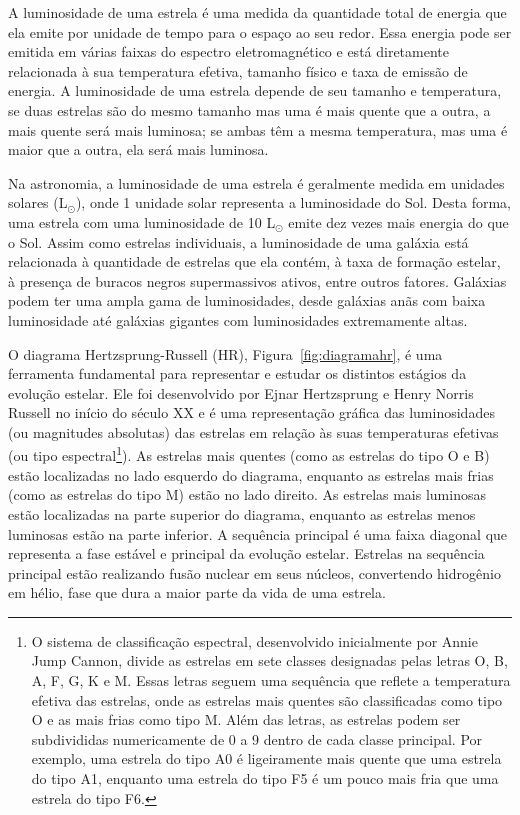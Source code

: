 A luminosidade de uma estrela é uma medida da quantidade total de energia que ela emite por unidade de tempo para o espaço ao seu redor. Essa energia pode ser emitida em várias faixas do espectro eletromagnético e está diretamente relacionada à sua temperatura efetiva, tamanho físico e taxa de emissão de energia. A luminosidade de uma estrela depende de seu tamanho e temperatura, se duas estrelas são do mesmo tamanho mas uma é mais quente que a outra, a mais quente será mais luminosa; se ambas têm a mesma temperatura, mas uma é maior que a outra, ela será mais luminosa.

Na astronomia, a luminosidade de uma estrela é geralmente medida em unidades solares (L\(_\odot\)), onde 1 unidade solar representa a luminosidade do Sol. Desta forma, uma estrela com uma luminosidade de 10 L\(_\odot\) emite dez vezes mais energia do que o Sol. Assim como estrelas individuais, a luminosidade de uma galáxia está relacionada à quantidade de estrelas que ela contém, à taxa de formação estelar, à presença de buracos negros supermassivos ativos, entre outros fatores. Galáxias podem ter uma ampla gama de luminosidades, desde galáxias anãs com baixa luminosidade até galáxias gigantes com luminosidades extremamente altas.

O diagrama Hertzsprung-Russell (HR), Figura~\ref{fig:diagramahr}, é uma ferramenta fundamental para representar e estudar os distintos estágios da evolução estelar. Ele foi desenvolvido por Ejnar Hertzsprung e Henry Norris Russell no início do século XX e é uma representação gráfica das luminosidades (ou magnitudes absolutas) das estrelas em relação às suas temperaturas efetivas (ou tipo espectral\footnote[7]{O sistema de classificação espectral, desenvolvido inicialmente por Annie Jump Cannon, divide as estrelas em sete classes designadas pelas letras O, B, A, F, G, K e M. Essas letras seguem uma sequência que reflete a temperatura efetiva das estrelas, onde as estrelas mais quentes são classificadas como tipo O e as mais frias como tipo M. Além das letras, as estrelas podem ser subdivididas numericamente de 0 a 9 dentro de cada classe principal. Por exemplo, uma estrela do tipo A0 é ligeiramente mais quente que uma estrela do tipo A1, enquanto uma estrela do tipo F5 é um pouco mais fria que uma estrela do tipo F6.}). As estrelas mais quentes (como as estrelas do tipo O e B) estão localizadas no lado esquerdo do diagrama, enquanto as estrelas mais frias (como as estrelas do tipo M) estão no lado direito. As estrelas mais luminosas estão localizadas na parte superior do diagrama, enquanto as estrelas menos luminosas estão na parte inferior. A sequência principal é uma faixa diagonal que representa a fase estável e principal da evolução estelar. Estrelas na sequência principal estão realizando fusão nuclear em seus núcleos, convertendo hidrogênio em hélio, fase que dura a maior parte da vida de uma estrela. 

